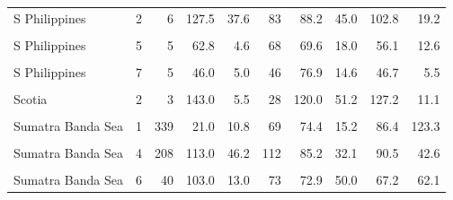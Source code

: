 \begin{ThreePartTable}
\begin{longtable}[t]{lrrrrrrrrr}
S Philippines & 2 & 6 & 127.5 & 37.6 & 83 & 88.2 & 45.0 & 102.8 & 19.2\\
\cellcolor{gray!6}{S Philippines} & \cellcolor{gray!6}{4} & \cellcolor{gray!6}{4} & \cellcolor{gray!6}{97.0} & \cellcolor{gray!6}{105.8} & \cellcolor{gray!6}{62} & \cellcolor{gray!6}{73.0} & \cellcolor{gray!6}{24.7} & \cellcolor{gray!6}{49.0} & \cellcolor{gray!6}{11.9}\\
S Philippines & 5 & 5 & 62.8 & 4.6 & 68 & 69.6 & 18.0 & 56.1 & 12.6\\
\cellcolor{gray!6}{S Philippines} & \cellcolor{gray!6}{6} & \cellcolor{gray!6}{3} & \cellcolor{gray!6}{62.8} & \cellcolor{gray!6}{19.0} & \cellcolor{gray!6}{72} & \cellcolor{gray!6}{76.8} & \cellcolor{gray!6}{27.4} & \cellcolor{gray!6}{48.6} & \cellcolor{gray!6}{24.8}\\
S Philippines & 7 & 5 & 46.0 & 5.0 & 46 & 76.9 & 14.6 & 46.7 & 5.5\\
\cellcolor{gray!6}{S Philippines} & \cellcolor{gray!6}{8} & \cellcolor{gray!6}{4} & \cellcolor{gray!6}{45.5} & \cellcolor{gray!6}{7.2} & \cellcolor{gray!6}{65} & \cellcolor{gray!6}{81.4} & \cellcolor{gray!6}{18.0} & \cellcolor{gray!6}{44.4} & \cellcolor{gray!6}{4.8}\\
Scotia & 2 & 3 & 143.0 & 5.5 & 28 & 120.0 & 51.2 & 127.2 & 11.1\\
\cellcolor{gray!6}{Scotia} & \cellcolor{gray!6}{3} & \cellcolor{gray!6}{9} & \cellcolor{gray!6}{134.0} & \cellcolor{gray!6}{37.0} & \cellcolor{gray!6}{54} & \cellcolor{gray!6}{90.2} & \cellcolor{gray!6}{38.9} & \cellcolor{gray!6}{127.1} & \cellcolor{gray!6}{8.9}\\
Sumatra Banda Sea & 1 & 339 & 21.0 & 10.8 & 69 & 74.4 & 15.2 & 86.4 & 123.3\\
\cellcolor{gray!6}{Sumatra Banda Sea} & \cellcolor{gray!6}{3} & \cellcolor{gray!6}{23} & \cellcolor{gray!6}{80.0} & \cellcolor{gray!6}{24.2} & \cellcolor{gray!6}{59} & \cellcolor{gray!6}{75.4} & \cellcolor{gray!6}{22.6} & \cellcolor{gray!6}{70.2} & \cellcolor{gray!6}{23.7}\\
Sumatra Banda Sea & 4 & 208 & 113.0 & 46.2 & 112 & 85.2 & 32.1 & 90.5 & 42.6\\
\cellcolor{gray!6}{Sumatra Banda Sea} & \cellcolor{gray!6}{5} & \cellcolor{gray!6}{192} & \cellcolor{gray!6}{123.0} & \cellcolor{gray!6}{32.5} & \cellcolor{gray!6}{95} & \cellcolor{gray!6}{85.4} & \cellcolor{gray!6}{36.9} & \cellcolor{gray!6}{100.4} & \cellcolor{gray!6}{58.9}\\
Sumatra Banda Sea & 6 & 40 & 103.0 & 13.0 & 73 & 72.9 & 50.0 & 67.2 & 62.1\\

\end{longtable}
\end{ThreePartTable}
